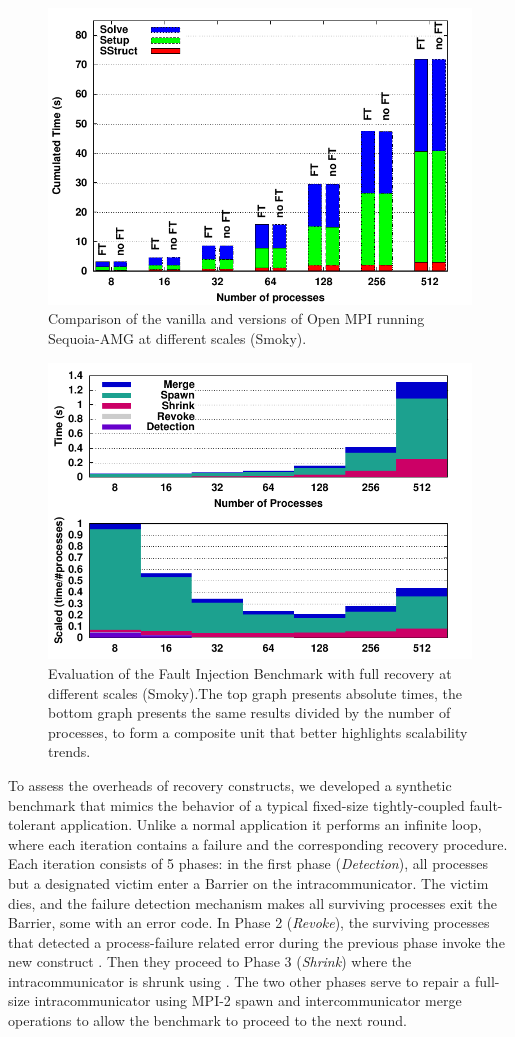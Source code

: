 \begin{figure}[ht]
\centering
    \includegraphics[width=.7\linewidth]{figures/bargraph.pdf}%
    \caption{Comparison of the vanilla and \ulfm versions of Open MPI running
      Sequoia-AMG at different scales (Smoky).\label{fig:sequoia:bargraph}}
\end{figure}
\begin{figure}[ht]
\centering
    \includegraphics[width=.7\linewidth]{figures/repair.pdf}%
    \caption{Evaluation of the Fault Injection Benchmark with full
      recovery at different scales (Smoky).\label{fig:frssj:scalability}The top graph presents absolute times, the bottom graph presents the same results divided by the number of processes, to form a composite unit that better highlights scalability trends.}
\end{figure}

To assess the overheads of recovery constructs, we developed a synthetic
benchmark that mimics the behavior of a typical fixed-size tightly-coupled
fault-tolerant application. Unlike a normal application it performs an infinite
loop, where each iteration contains a failure and the corresponding recovery
procedure. Each iteration consists of 5 phases: in the first phase
(\emph{Detection}), all processes but a designated victim enter a Barrier on the
intracommunicator. The victim dies, and the failure detection mechanism makes
all surviving processes exit the Barrier, some with an error code. In Phase 2
(\emph{Revoke}), the surviving processes that detected a process-failure related
error during the previous phase invoke the new construct
. Then they proceed to Phase 3 (\emph{Shrink}) where
the intracommunicator is shrunk using . The two
other phases serve to repair a full-size intracommunicator using MPI-2
spawn and intercommunicator merge operations to allow the
benchmark to proceed to the next round.

